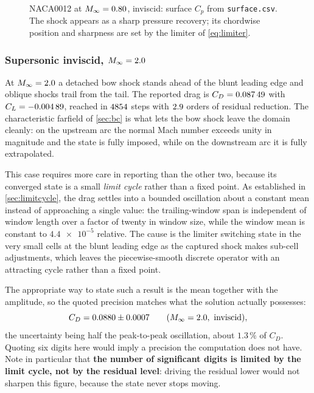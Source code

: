 \begin{figure}[htbp]
  \centering
  \caption{NACA0012 at $M_\infty=0.80$, inviscid: surface $C_p$ from
  \texttt{surface.csv}. The shock appears as a sharp pressure recovery; its
  chordwise position and sharpness are set by the limiter of
  \cref{eq:limiter}.}
  \label{fig:naca080inv-cp}
\end{figure}

\subsubsection{Supersonic inviscid, $M_\infty=2.0$}

At $M_\infty=2.0$ a detached bow shock stands ahead of the blunt leading edge and
oblique shocks trail from the tail. The reported drag is
$C_D=\num{0.08749}$ with $C_L=\num{-0.00489}$, reached in
$\num{4854}$ steps with $\num{2.9}$ orders of residual
reduction. The characteristic farfield of \cref{sec:bc} is what lets the bow shock
leave the domain cleanly: on the upstream arc the normal Mach number exceeds unity
in magnitude and the state is fully imposed, while on the downstream arc it is
fully extrapolated.

This case requires more care in reporting than the other two, because its
converged state is a small \emph{limit cycle} rather than a fixed point. As
established in \cref{sec:limitcycle}, the drag settles into a bounded oscillation
about a constant mean instead of approaching a single value: the trailing-window
span is independent of window length over a factor of twenty in window size, while
the window mean is constant to $\num{4.4e-5}$ relative. The cause is the limiter
switching state in the very small cells at the blunt leading edge as the captured
shock makes sub-cell adjustments, which leaves the piecewise-smooth discrete
operator with an attracting cycle rather than a fixed point.

The appropriate way to state such a result is the mean together with the
amplitude, so the quoted precision matches what the solution actually possesses:
\begin{equation}
  C_D = 0.0880 \pm 0.0007 \qquad (M_\infty=2.0,\ \text{inviscid}),
  \label{eq:m200drag}
\end{equation}
the uncertainty being half the peak-to-peak oscillation, about $1.3\,\%$ of $C_D$.
Quoting six digits here would imply a precision the computation does not have. Note
in particular that \textbf{the number of significant digits is limited by the limit
cycle, not by the residual level}: driving the residual lower would not sharpen
this figure, because the state never stops moving.

